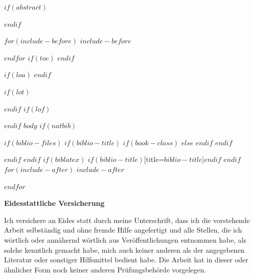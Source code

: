 \documentclass[$if(fontsize)$$fontsize$,$endif$$if(lang)$$lang$,$endif$$if(papersize)$$papersize$,$endif$$for(classoption)$$classoption$$sep$,$endfor$]{$documentclass$}
\begin{document}
\restoregeometry

$if(abstract)$
\begin{abstract}
$abstract$
\end{abstract}
$endif$

$for(include-before)$
$include-before$

$endfor$
$if(toc)$
{
\hypersetup{linkcolor=black}
\setcounter{tocdepth}{$toc-depth$}
\tableofcontents
}
$endif$


$if(loa)$
\newpage
\printnoidxglossary[type=acronym, style=superheader,title=Acronyms]
$endif$

$if(lot)$
\newpage
\listoftables
$endif$
$if(lof)$
\newpage
\listoffigures
$endif$
\newpage
{} 
$body$
$if(natbib)$

$if(biblio-files)$
$if(biblio-title)$
$if(book-class)$
\renewcommand\bibname{$biblio-title$}
$else$
\renewcommand\refname{$biblio-title$}
$endif$
$endif$


$endif$
$endif$
$if(biblatex)$
\renewcommand*{\mkbibnamefamily}[1]{\textbf{#1}}
\renewcommand*{\mkbibnamegiven}[1]{\textbf{#1}}
\renewcommand*{\mkbibnameprefix}[1]{\textbf{#1}}
\renewcommand*{\mkbibnamesuffix}[1]{\textbf{#1}}
\printbibliography$if(biblio-title)$[title=$biblio-title$]$endif$
$endif$
$for(include-after)$
$include-after$

$endfor$

\newpage
\textbf{Eidesstattliche Versicherung}

\bigskip

Ich versichere an Eides statt durch meine Unterschrift, dass ich die vorstehende Arbeit selbständig und ohne fremde Hilfe angefertigt und alle Stellen, die ich wörtlich oder annähernd wörtlich aus Veröffentlichungen entnommen habe, als solche kenntlich gemacht habe, mich auch keiner anderen als der angegebenen Literatur oder sonstiger Hilfsmittel bedient habe. Die Arbeit hat in dieser oder ähnlicher Form noch keiner anderen Prüfungsbehörde vorgelegen.

\vspace{1cm}
\rule{0pt}{2\baselineskip} %
\par\noindent{} \hfill\makebox[2.25in]{\hrulefill}%
\par\noindent\makebox[2.25in][l]{} \hfill{}%
\end{document}
